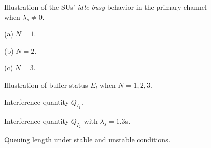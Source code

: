 \documentclass[11pt,draftcls]{IEEEtran}{\onecolumn}
\begin{document}
\begin{figure}[!h]
\centering
  \vspace{-0.5cm}
  \caption{Illustration of the SUs' \emph{idle-busy} behavior in the primary channel when $\lambda_s \neq 0$.}\label{fig7}
\end{figure}

\begin{figure}[!h]
\begin{minipage}[t]{.5\linewidth}
  \centering
  \centerline{}
  \vspace{-0.3cm}
  \centerline{\scriptsize{(a) $N=1$.}}
\end{minipage}
\hfill
\begin{minipage}[t]{0.5\linewidth}
  \centering
  \centerline{}
  \vspace{-0.3cm}
  \centerline{\scriptsize{(b)  $N=2$.}}\vspace{0.5cm}
\end{minipage}
\begin{minipage}[t]{1.0\linewidth}
  \centering
  \centerline{}
  \vspace{-0.3cm}
  \centerline{\scriptsize{(c)  $N=3$.}}\medskip
\end{minipage}
\caption{Illustration of buffer status $E_l$ when $N=1,2,3$.}\label{fig8}
\end{figure}

\begin{figure}[!h]
\begin{minipage}[t]{0.5\linewidth}
  \centering
  \centerline{}
  \vspace{-0.5cm}
  \caption{Interference quantity $Q_{I_1}$.}\vspace{-0.01cm}\label{fig9}
\end{minipage}
\hfill
\begin{minipage}[t]{0.5\linewidth}
  \centering
  \centerline{}
  \vspace{-0.5cm}
  \caption{Interference quantity $Q_{I_2}$ with $\lambda_s=1.3$s.}\vspace{-0.01cm}\label{fig10}
\end{minipage}
\end{figure}

\begin{figure}[!h]
  \centering
  \centerline{}
  \vspace{-0.5cm}
  \caption{Queuing length under stable and unstable conditions.}\label{fig11}\vspace{-0.01cm}
\end{figure}
\end{document}
